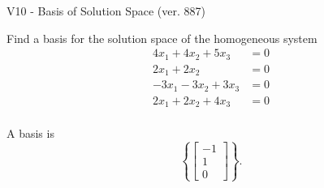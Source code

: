 \begin{exercise}
  \begin{exerciseTitle}V10 - Basis of Solution Space (ver. 887)\end{exerciseTitle}
  \begin{exerciseStatement}
    Find a basis for the solution space of the homogeneous system 
\begin{align*}
 4 x_ 1 + 4 x_ 2 + 5 x_ 3 &= 0  \\ 
  2 x_ 1 + 2 x_ 2 &= 0  \\ 
  -3 x_ 1 -3 x_ 2 + 3 x_ 3 &= 0  \\ 
  2 x_ 1 + 2 x_ 2 + 4 x_ 3 &= 0  \\ 
 \end{align*}


 
  \end{exerciseStatement}

  \begin{exerciseAnswer}
   A basis is   
\[\left\{\left[\begin{array}{c}
-1 \\
1 \\
0
\end{array}\right]\right\}.\]

  


  \end{exerciseAnswer}
\end{exercise}